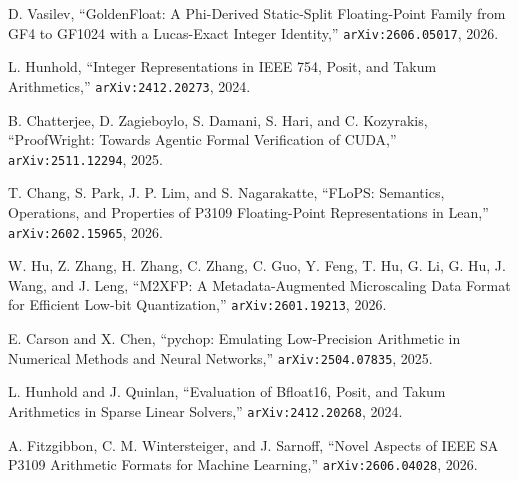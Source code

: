 


 D. Vasilev, ``GoldenFloat: A Phi-Derived Static-Split Floating-Point Family from GF4 to GF1024 with a Lucas-Exact Integer Identity,''
  \texttt{arXiv:2606.05017}, 2026.

 L. Hunhold, ``Integer Representations in IEEE 754, Posit, and Takum Arithmetics,''
  \texttt{arXiv:2412.20273}, 2024.

 B. Chatterjee, D. Zagieboylo, S. Damani, S. Hari, and C. Kozyrakis, ``ProofWright: Towards Agentic Formal Verification of CUDA,''
  \texttt{arXiv:2511.12294}, 2025.

 T. Chang, S. Park, J. P. Lim, and S. Nagarakatte, ``FLoPS: Semantics, Operations, and Properties of P3109 Floating-Point Representations in Lean,''
  \texttt{arXiv:2602.15965}, 2026.

 W. Hu, Z. Zhang, H. Zhang, C. Zhang, C. Guo, Y. Feng, T. Hu, G. Li, G. Hu, J. Wang, and J. Leng, ``M2XFP: A Metadata-Augmented Microscaling Data Format for Efficient Low-bit Quantization,''
  \texttt{arXiv:2601.19213}, 2026.

 E. Carson and X. Chen, ``pychop: Emulating Low-Precision Arithmetic in Numerical Methods and Neural Networks,''
  \texttt{arXiv:2504.07835}, 2025.

 L. Hunhold and J. Quinlan, ``Evaluation of Bfloat16, Posit, and Takum Arithmetics in Sparse Linear Solvers,''
  \texttt{arXiv:2412.20268}, 2024.

 A. Fitzgibbon, C. M. Wintersteiger, and J. Sarnoff, ``Novel Aspects of IEEE SA P3109 Arithmetic Formats for Machine Learning,''
  \texttt{arXiv:2606.04028}, 2026.

